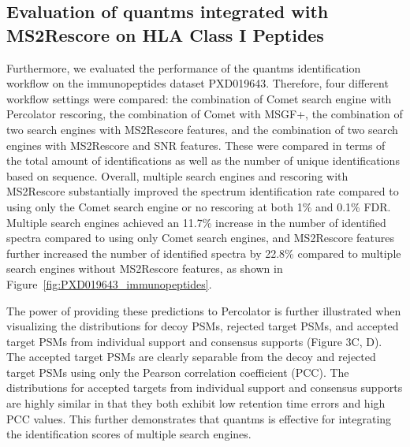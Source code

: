\documentclass[12pt]{article}
\begin{document}
\subsection{Evaluation of quantms integrated with MS2Rescore on HLA Class I Peptides}
Furthermore, we evaluated the performance of the quantms identification workflow on the immunopeptides dataset PXD019643. Therefore, four different workflow settings were compared: the combination of Comet search engine with Percolator rescoring, the combination of Comet with MSGF+, the combination of two search engines with MS2Rescore features, and the combination of two search engines with MS2Rescore and SNR features. These were compared in terms of the total amount of identifications as well as the number of unique identifications based on sequence. Overall, multiple search engines and rescoring with MS2Rescore substantially improved the spectrum identification rate compared to using only the Comet search engine or no rescoring at both 1\% and 0.1\% FDR. Multiple search engines achieved an 11.7\% increase in the number of identified spectra compared to using only Comet search engines, and MS2Rescore features further increased the number of identified spectra by 22.8\% compared to multiple search engines without MS2Rescore features, as shown in Figure~\ref{fig:PXD019643_immunopeptides}.

The power of providing these predictions to Percolator is further illustrated when visualizing the distributions for decoy PSMs, rejected target PSMs, and accepted target PSMs from individual support and consensus supports (Figure 3C, D). The accepted target PSMs are clearly separable from the decoy and rejected target PSMs using only the Pearson correlation coefficient (PCC). The distributions for accepted targets from individual support and consensus supports are highly similar in that they both exhibit low retention time errors and high PCC values. This further demonstrates that quantms is effective for integrating the identification scores of multiple search engines.
\end{document}
